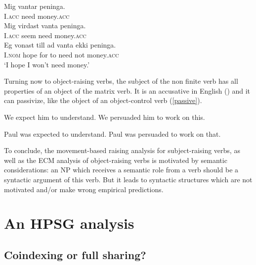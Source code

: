 \documentclass[output=paper]{langsci/langscibook}
\begin{document}
\begin{exe}
\ex \begin{xlist}
\ex \gll Mig vantar peninga. \\
I.\textsc{acc} need money.\textsc{acc} \\
\ex \gll Mig virdast vanta peninga. \label{need} \\
I.\textsc{acc} seem need money.\textsc{acc} \\
\ex \gll Eg vonast till ad vanta ekki peninga. \label{hope} \\
I.\textsc{nom} hope for to need not money.\textsc{acc} \\
\glt `I hope I won't need money.'
	\end{xlist}	
	
\end{exe}

Turning now to object-raising verbs, the subject of the non finite verb has all properties of an object of the matrix verb. It is an accusative in English () and it can passivize, like the object of an object-control verb (\ref{passive}).

\begin{exe}
\ex
\begin{xlist}
\ex We expect him to understand.
\ex  We persuaded him to work on this.
\end{xlist}
\ex \begin{xlist} \label{passive}
\ex  Paul was expected to understand.
\ex 	Paul was persuaded to work on that.
\end{xlist}
	
\end{exe}

To conclude, the movement-based raising analysis for subject-raising verbs, as well as the ECM analysis of object-raising verbs is motivated by semantic considerations: an NP which receives a semantic role from a verb should be a syntactic argument of this verb. But it leads to syntactic structures which are not motivated and/or make wrong empirical predictions.
 


\section{An HPSG analysis}


\subsection{Coindexing or full sharing?}
\end{document}
